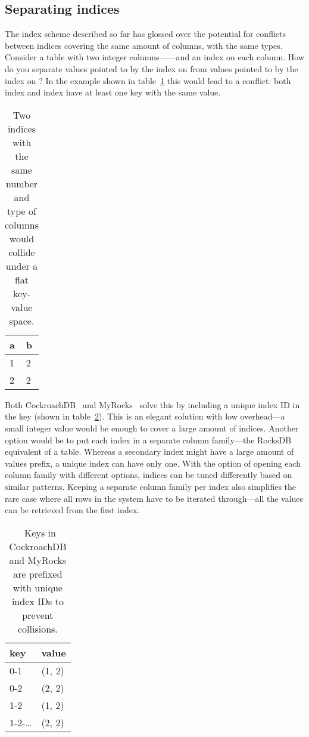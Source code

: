\subsection{Separating indices}

The index scheme described so far has glossed over the potential for conflicts
between indices covering the same amount of columns, with the same types.
Consider a table with two integer columns------and an index on each
column. How do you separate values pointed to by the index on  from
values pointed to by the index on ? In the example shown in
table~\ref{table:colliding} this would lead to a conflict: both index 
and index  have at least one key with the same value.

\begin{table}[H]
  \centering
  \begin{tabular}{l l}
    \toprule
    \textbf{a} & \textbf{b} \\ \midrule
    1 & 2 \\ \midrule
    2 & 2 \\ \midrule
  \end{tabular}

  \caption{Two indices with the same number and type of columns would collide
  under a flat key-value space.}\label{table:colliding}
\end{table}

Both CockroachDB~\cite{cockroach-encoding} and MyRocks~\cite{myrocks-encoding}
solve this by including a unique index ID in the key (shown in
table~\ref{table:index-id}). This is an elegant solution with low overhead---a
small integer value would be enough to cover a large amount of indices. Another
option would be to put each index in a separate column family---the RocksDB
equivalent of a table. Whereas a secondary index might have a large amount of
values prefix, a unique index can have only one. With the option of opening each
column family with different options, indices can be tuned differently based on
similar patterns. Keeping a separate column family per index also simplifies the
rare case where all rows in the system have to be iterated through---all the
values can be retrieved from the first index.

\begin{table}[H]
  \centering
  \begin{tabular}{l l}
    \toprule
    \textbf{key} & \textbf{value} \\ \midrule
    0-1 & (1, 2) \\ \midrule
    0-2 & (2, 2) \\ \midrule
    1-2 & (1, 2) \\ \midrule
    1-2-\dots & (2, 2) \\ \midrule
  \end{tabular}

  \caption{\
    Keys in CockroachDB and MyRocks are prefixed with unique index IDs to
    prevent collisions.
  }\label{table:index-id}
\end{table}

